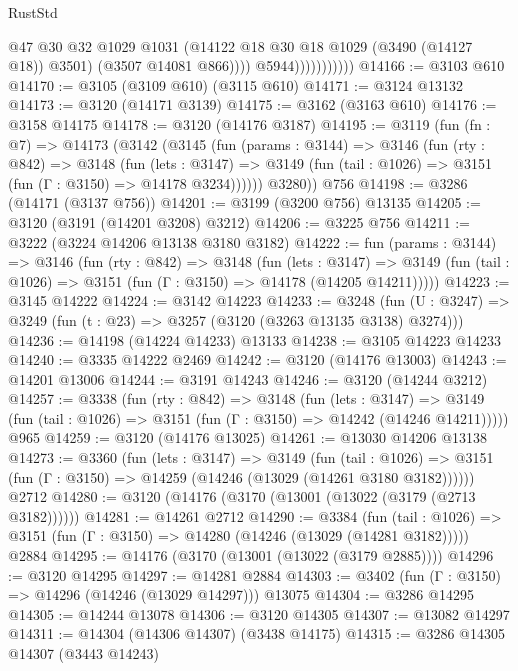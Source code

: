 \begin{lexlean}{RustStd}
\begin{coremodule}
                                @47
                                @30
                                @32
                                @1029
                                @1031
                                (@14122 @18 @30 @18 @1029 (@3490 (@14127 @18)) @3501)
                                (@3507 @14081 @866))))
                          @5944)))))))))))
@14166 := @3103 @610
@14170 := @3105 (@3109 @610) (@3115 @610)
@14171 := @3124 @13132
@14173 := @3120 (@14171 @3139)
@14175 := @3162 (@3163 @610)
@14176 := @3158 @14175
@14178 := @3120 (@14176 @3187)
@14195 := @3119
    (fun (fn : @7) =>
    @14173
      (@3142
        (@3145
          (fun (params : @3144) =>
          @3146
            (fun (rty : @842) =>
            @3148
              (fun (lets : @3147) =>
              @3149 (fun (tail : @1026) => @3151 (fun (Γ : @3150) => @14178 @3234))))))
        @3280))
    @756
@14198 := @3286 (@14171 (@3137 @756))
@14201 := @3199 (@3200 @756) @13135
@14205 := @3120 (@3191 (@14201 @3208) @3212)
@14206 := @3225 @756
@14211 := @3222 (@3224 @14206 @13138 @3180 @3182)
@14222 := fun (params : @3144) =>
  @3146
    (fun (rty : @842) =>
    @3148
      (fun (lets : @3147) =>
      @3149 (fun (tail : @1026) => @3151 (fun (Γ : @3150) => @14178 (@14205 @14211)))))
@14223 := @3145 @14222
@14224 := @3142 @14223
@14233 := @3248
    (fun (U : @3247) => @3249 (fun (t : @23) => @3257 (@3120 (@3263 @13135 @3138) @3274)))
@14236 := @14198 (@14224 @14233) @13133
@14238 := @3105 @14223 @14233
@14240 := @3335 @14222 @2469
@14242 := @3120 (@14176 @13003)
@14243 := @14201 @13006
@14244 := @3191 @14243
@14246 := @3120 (@14244 @3212)
@14257 := @3338
    (fun (rty : @842) =>
    @3148
      (fun (lets : @3147) =>
      @3149 (fun (tail : @1026) => @3151 (fun (Γ : @3150) => @14242 (@14246 @14211)))))
    @965
@14259 := @3120 (@14176 @13025)
@14261 := @13030 @14206 @13138
@14273 := @3360
    (fun (lets : @3147) =>
    @3149
      (fun (tail : @1026) =>
      @3151 (fun (Γ : @3150) => @14259 (@14246 (@13029 (@14261 @3180 @3182))))))
    @2712
@14280 := @3120 (@14176 (@3170 (@13001 (@13022 (@3179 (@2713 @3182))))))
@14281 := @14261 @2712
@14290 := @3384
    (fun (tail : @1026) => @3151 (fun (Γ : @3150) => @14280 (@14246 (@13029 (@14281 @3182)))))
    @2884
@14295 := @14176 (@3170 (@13001 (@13022 (@3179 @2885))))
@14296 := @3120 @14295
@14297 := @14281 @2884
@14303 := @3402 (fun (Γ : @3150) => @14296 (@14246 (@13029 @14297))) @13075
@14304 := @3286 @14295
@14305 := @14244 @13078
@14306 := @3120 @14305
@14307 := @13082 @14297
@14311 := @14304 (@14306 @14307) (@3438 @14175)
@14315 := @3286 @14305 @14307 (@3443 @14243)

\end{coremodule}
\end{lexlean}
